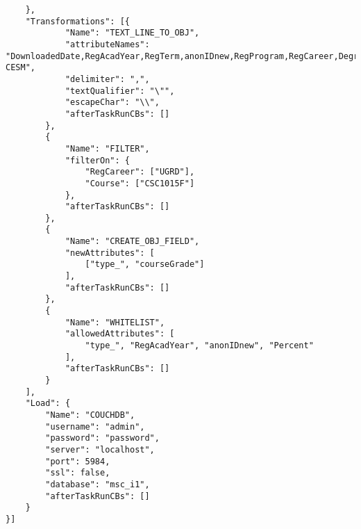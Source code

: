 \begin{verbatim}
    },
    "Transformations": [{
            "Name": "TEXT_LINE_TO_OBJ",
            "attributeNames": "DownloadedDate,RegAcadYear,RegTerm,anonIDnew,RegProgram,RegCareer,Degree,DegreeDescr,Subject,Catalog.,Course,CourseSuffix,Session,Percent,Symbol,UnitsTaken,CourseID,CourseDescr,CourseCareer,Faculty,Dept,MaximumCrseUnits,CourseCount,CourseLevel,CESM,Sub-CESM",
            "delimiter": ",",
            "textQualifier": "\"",
            "escapeChar": "\\",
            "afterTaskRunCBs": []
        },
        {
            "Name": "FILTER",
            "filterOn": {
                "RegCareer": ["UGRD"],
                "Course": ["CSC1015F"]
            },
            "afterTaskRunCBs": []
        },
        {
            "Name": "CREATE_OBJ_FIELD",
            "newAttributes": [
                ["type_", "courseGrade"]
            ],
            "afterTaskRunCBs": []
        },
        {
            "Name": "WHITELIST",
            "allowedAttributes": [
                "type_", "RegAcadYear", "anonIDnew", "Percent"
            ],
            "afterTaskRunCBs": []
        }
    ],
    "Load": {
        "Name": "COUCHDB",
        "username": "admin",
        "password": "password",
        "server": "localhost",
        "port": 5984,
        "ssl": false,
        "database": "msc_i1",
        "afterTaskRunCBs": []
    }
}]
\end{verbatim}

